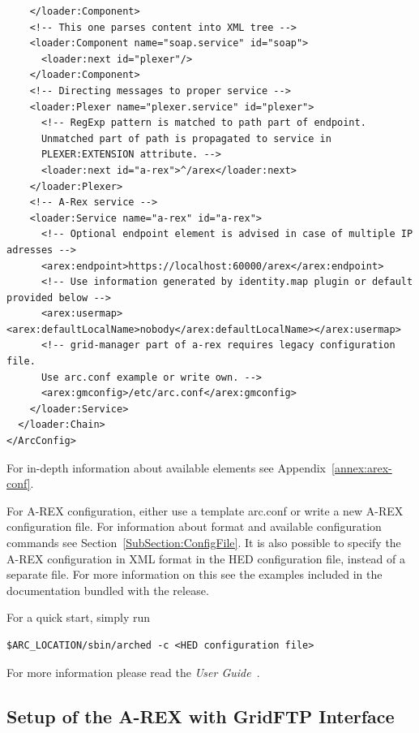\documentclass{article}                            %
\begin{document}
\begin{shaded}
\begin{verbatim}
    </loader:Component>
    <!-- This one parses content into XML tree -->
    <loader:Component name="soap.service" id="soap">
      <loader:next id="plexer"/>
    </loader:Component>
    <!-- Directing messages to proper service -->
    <loader:Plexer name="plexer.service" id="plexer">
      <!-- RegExp pattern is matched to path part of endpoint.
      Unmatched part of path is propagated to service in
      PLEXER:EXTENSION attribute. -->
      <loader:next id="a-rex">^/arex</loader:next>
    </loader:Plexer>
    <!-- A-Rex service -->
    <loader:Service name="a-rex" id="a-rex">
      <!-- Optional endpoint element is advised in case of multiple IP adresses -->
      <arex:endpoint>https://localhost:60000/arex</arex:endpoint>
      <!-- Use information generated by identity.map plugin or default provided below -->
      <arex:usermap><arex:defaultLocalName>nobody</arex:defaultLocalName></arex:usermap>
      <!-- grid-manager part of a-rex requires legacy configuration file.
      Use arc.conf example or write own. -->
      <arex:gmconfig>/etc/arc.conf</arex:gmconfig>
    </loader:Service>
  </loader:Chain>
</ArcConfig>
\end{verbatim}
\end{shaded}

For in-depth information about available elements see Appendix~\ref{annex:arex-conf}. 

For A-REX configuration, either use a template arc.conf or write a new
A-REX configuration file.  For information about format and available
configuration commands see Section~\ref{SubSection:ConfigFile}. It is
also possible to specify the A-REX configuration in XML format in the
HED configuration file, instead of a separate file. For more
information on this see the examples included in the documentation
bundled with the release.

For a quick start, simply run

\begin{shaded}
\begin{verbatim}
$ARC_LOCATION/sbin/arched -c <HED configuration file>
\end{verbatim}
\end{shaded}

For more information please read the \emph{User Guide}~\cite{userguide1}.


\subsection{Setup of the A-REX with GridFTP Interface}
\end{document}
